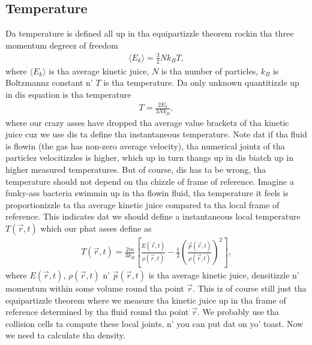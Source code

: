 \subsection{Temperature}
Da temperature is defined all up in tha equipartizzle theorem rockin tha three momentum degreez of freedom
\begin{align}
	\langle E_k \rangle = \frac{3}{2}Nk_BT,
\end{align}
where $\langle E_k \rangle$ is tha average kinetic juice, $N$ is tha number of particles, $k_B$ is Boltzmannz constant n' $T$ is tha temperature. Da only unknown quantitizzle up in dis equation is tha temperature
\begin{align}
	\label{eq:dsmc_temperature}
	T = \frac{2E_k}{3Nk_B},
\end{align}
where our crazy asses have dropped tha average value bracketz of tha kinetic juice cuz we use dis ta define tha instantaneous temperature. Note dat if tha fluid is flowin (the gas has non-zero average velocity), tha numerical jointz of tha particlez velocitizzles is higher, which up in turn thangs up in dis biatch up in higher measured temperatures. But of course, dis has ta be wrong, tha temperature should not depend on tha chizzle of frame of reference. Imagine a funky-ass bacteria swimmin up in tha flowin fluid, tha temperature it feels is proportionizzle ta tha average kinetic juice compared ta tha local frame of reference. This indicates dat we should define a instantaneous local temperature $T(\vec r, t)$ which our phat asses define as
\begin{align}
	\label{eq:dsmc_local_temperature}
	T(\vec r, t) = \frac{2m}{3k_B}\left[\frac{E(\vec r, t)}{\rho(\vec r, t)} - \frac{1}{2}\left(\frac{\vec p(\vec r, t)}{\rho(\vec r, t)}\right)^2\right],
\end{align}
where $E(\vec r,t)$, $\rho(\vec r,t)$ n' $\vec p(\vec r,t)$ is tha average kinetic juice, densitizzle n' momentum within some volume round tha point $\vec r$. This iz of course still just tha equipartizzle theorem where we measure tha kinetic juice up in tha frame of reference determined by tha fluid round tha point $\vec r$. We probably use tha collision cells ta compute these local joints, n' you can put dat on yo' toast. Now we need ta calculate tha density.
